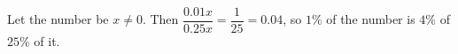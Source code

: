 Let the number be $x\ne0$. Then $\dfrac{0.01x}{0.25x}=\dfrac{1}{25}=0.04$, so $1\%$ of the number is $\boxed{4\%}$ of $25\%$ of it.
